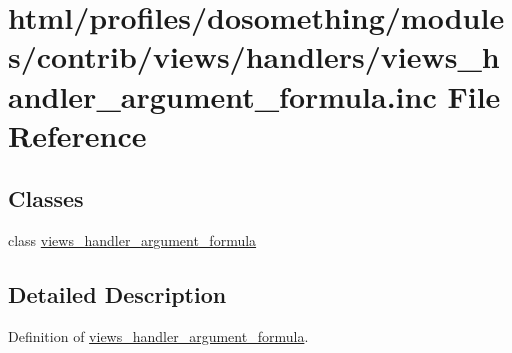 \hypertarget{views__handler__argument__formula_8inc}{
\section{html/profiles/dosomething/modules/contrib/views/handlers/views\_\-handler\_\-argument\_\-formula.inc File Reference}
\label{views__handler__argument__formula_8inc}
}
\subsection*{Classes}
\begin{DoxyCompactItemize}
\item 
class \hyperlink{classviews__handler__argument__formula}{views\_\-handler\_\-argument\_\-formula}
\end{DoxyCompactItemize}


\subsection{Detailed Description}
Definition of \hyperlink{classviews__handler__argument__formula}{views\_\-handler\_\-argument\_\-formula}. 